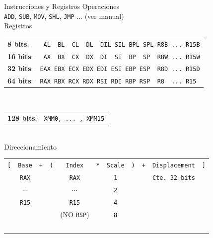\documentclass[aspectratio=169]{beamer}
\begin{document}
\begin{frame}[t,fragile]{Instrucciones y Registros}
    \small
    Operaciones\\
    \vspace{0.2cm}
    \verb|ADD|, \verb|SUB|, \verb|MOV|, \verb|SHL|, \verb|JMP| ... \pause (ver manual)\\
    \vspace{0.5cm}
    \pause
    Registros\\
    \vspace{0.2cm}
    \begin{tabular}{ll}
    \textbf{8 bits}:   & \verb| AL  BL  CL  DL  DIL SIL BPL SPL R8B ... R15B|\\ %
    \textbf{16 bits}:  & \verb| AX  BX  CX  DX  DI  SI  BP  SP  R8W ... R15W|\\ %
    \textbf{32 bits}:  & \verb|EAX EBX ECX EDX EDI ESI EBP ESP  R8D ... R15D|\\ %
    \textbf{64 bits}:  & \verb|RAX RBX RCX RDX RSI RDI RBP RSP  R8  ... R15|\\ %
    \end{tabular}\\
    \pause
    \vspace{0.2cm}
    \begin{tabular}{ll}
    \textbf{128 bits}: & \verb|XMM0, ... , XMM15|\\ %
    \end{tabular}\\
    \vspace{0.5cm}
    \pause
    Direccionamiento\\
    \vspace{0.3cm}
    \begin{tabular}{ccccccccccc}
    \verb|[| & \verb|Base| & \verb|+| & \verb|(| & \verb|Index| & \verb|*| & \verb|Scale|   & \verb|)| & \verb|+| & \verb|Displacement| & \verb|]|\\
    \cline{2-2} \cline{5-5} \cline{7-7} \cline{10-10}
            & \verb|RAX|  &   &   &  \verb|RAX|  &   &    \verb|1|    &   &   & \verb|Cte. 32 bits| &\\\
            & $\cdots$    &   &   &  $\cdots$    &   &    \verb|2|    &   &   &                     &\\\
            & \verb|R15|  &   &   &  \verb|R15|  &   &    \verb|4|    &   &   &                     &\\\
            &             &   &   & \scriptsize (NO \verb|RSP|)& &    \verb|8|    &   &   &                     &\\\
    \end{tabular}
\end{frame}
\end{document}
